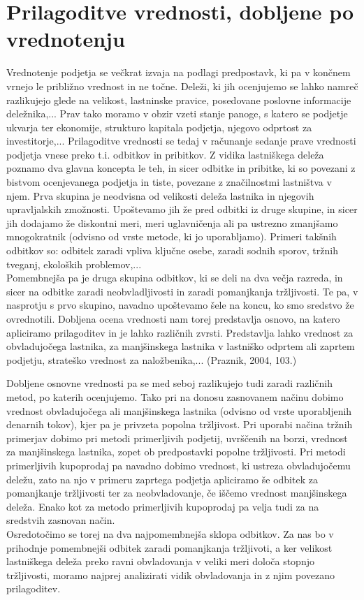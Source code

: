 \documentclass[12pt,a4paper]{amsart}
\theoremstyle{definition} %
\theoremstyle{plain} %
\begin{document}
\section{Prilagoditve vrednosti, dobljene po vrednotenju}
Vrednotenje podjetja se večkrat izvaja na podlagi predpostavk, ki pa v končnem vrnejo le približno vrednost in ne točne. Deleži, ki jih ocenjujemo se lahko namreč razlikujejo glede na velikost, lastninske pravice, posedovane poslovne informacije deležnika,... Prav tako moramo v obzir vzeti stanje panoge, s katero se podjetje ukvarja ter ekonomije, strukturo kapitala podjetja, njegovo odprtost za investitorje,... Prilagoditve vrednosti se tedaj v računanje sedanje prave vrednosti podjetja vnese preko t.i. odbitkov in pribitkov. Z vidika lastniškega deleža poznamo dva glavna koncepta le teh, in sicer odbitke in pribitke, ki so povezani z bistvom ocenjevanega podjetja in tiste, povezane z značilnostmi lastništva v njem. Prva skupina je neodvisna od velikosti deleža lastnika in njegovih upravljalskih zmožnosti. Upoštevamo jih že pred odbitki iz druge skupine, in sicer jih dodajamo že diskontni meri, meri uglavničenja ali pa ustrezno zmanjšamo mnogokratnik (odvisno od vrste metode, ki jo uporabljamo). Primeri takšnih odbitkov so: odbitek zaradi vpliva ključne osebe, zaradi sodnih sporov, tržnih tveganj, ekoloških problemov,... \\
Pomembnejša pa je druga skupina odbitkov, ki se deli na dva večja razreda, in sicer na odbitke zaradi neobvladljivosti in zaradi pomanjkanja tržljivosti. Te pa, v nasprotju s prvo skupino, navadno upoštevamo šele na koncu, ko smo sredstvo že ovrednotili. Dobljena ocena vrednosti nam torej predstavlja osnovo, na katero apliciramo prilagoditev in je lahko različnih zvrsti. Predstavlja lahko vrednost za obvladujočega lastnika, za manjšinskega lastnika v lastniško odprtem ali zaprtem podjetju, strateško vrednost za naložbenika,... (Praznik, 2004, 103.)\par
Dobljene osnovne vrednosti pa se med seboj razlikujejo tudi zaradi različnih metod, po katerih ocenjujemo. Tako pri na donosu zasnovanem načinu dobimo vrednost obvladujočega ali manjšinskega lastnika (odvisno od vrste uporabljenih denarnih tokov), kjer pa je privzeta popolna tržljivost. Pri uporabi načina tržnih primerjav dobimo pri metodi primerljivih podjetij, uvrščenih na borzi, vrednost za manjšinskega lastnika, zopet ob predpostavki popolne tržljivosti. Pri metodi primerljivih kupoprodaj pa navadno dobimo vrednost, ki ustreza obvladujočemu deležu, zato na njo v primeru zaprtega podjetja apliciramo še odbitek za pomanjkanje tržljivosti ter za neobvladovanje, če iščemo vrednost manjšinskega deleža. Enako kot za metodo primerljivih kupoprodaj pa velja tudi za na sredstvih zasnovan način.\\
Osredotočimo se torej na dva najpomembnejša sklopa odbitkov. Za nas bo v prihodnje pomembnejši odbitek zaradi pomanjkanja tržljivoti, a ker velikost lastniškega deleža preko ravni obvladovanja v veliki meri določa stopnjo tržljivosti, moramo najprej analizirati vidik obvladovanja in z njim povezano prilagoditev. 
\end{document}
